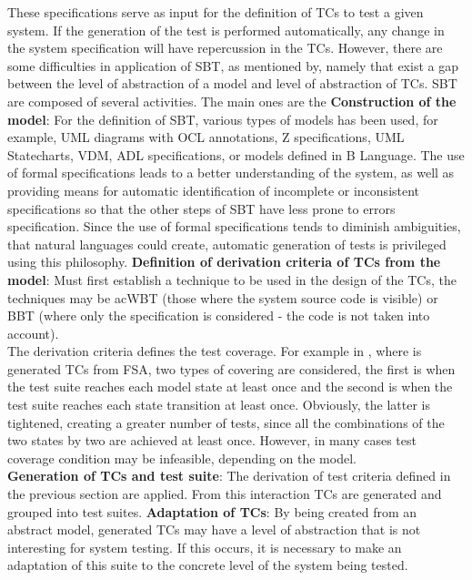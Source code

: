 {These specifications serve as input for the definition of \ac{TC}s to test a given system.
If the generation of the test is performed automatically, any change in the system specification will have repercussion in the \ac{TC}s.
However, there are some difficulties in application of \ac{SBT}, as mentioned by\cite{Bertolino04towardsanti-model-based},
namely that exist a gap between the level of abstraction of a model and level of abstraction of \ac{TC}s.
\ac{SBT} are composed of several activities. The main ones are\cite{Lindholm06model-basedtesting} the
\textbf{Construction of the model}: For the definition of \ac{SBT}, various types of models has been used, for example, \ac{UML} diagrams with
\ac{OCL} annotations\cite{Simula.SE.30}, Z specifications\cite{Horcher95improvingsoftware,Stocks:1996:FST:239916.239918},
\ac{UML} Statecharts\cite{Offutt:1999:GTU:1767297.1767341}, \ac{VDM}\cite{Aichernig99automatedblack-box},
\ac{ADL} specifications\cite{Sankar94specifyingand}, or models defined in B Language\cite{Legeard:2002:ABT:647541.730142,Bernard:2004:GTS:1134155.1134156}.
The use of formal specifications leads to a better understanding of the system, as well as providing means for automatic identification of incomplete
or inconsistent specifications so that the other steps of \ac{SBT} have less prone to errors specification.
Since the use of formal specifications tends to diminish ambiguities, that natural languages could create, automatic generation of tests is privileged using this philosophy.
\textbf{Definition of derivation criteria of \ac{TC}s from the model}: Must first establish a technique to be used in the design of the \ac{TC}s,
the techniques may be ac{WBT} (those where the system source code is visible) or \ac{BBT} (where only the specification is considered - the code is not taken into account).\\
The derivation criteria defines the test coverage. For example in \cite{Lindholm06model-basedtesting}, where is generated \ac{TC}s from \ac{FSA},
two types of covering are considered, the first is when the test suite reaches each model state at least once and the second
is when the test suite reaches each state transition at least once.
Obviously, the latter is tightened, creating a greater number of tests, since all the combinations of the two states by two
are achieved at least once. However, in many cases test coverage condition may be infeasible, depending on the model.\\
\textbf{Generation of \ac{TC}s and test suite}: The derivation of test criteria defined in the previous section are applied.
From this interaction \ac{TC}s are generated and grouped into test suites.
\textbf{Adaptation of \ac{TC}s}: 
By being created from an abstract model, generated \ac{TC}s
may have a level of abstraction that is not interesting for system testing.
If this occurs, it is necessary to make an adaptation of this suite to the concrete level of the system being tested.
}
